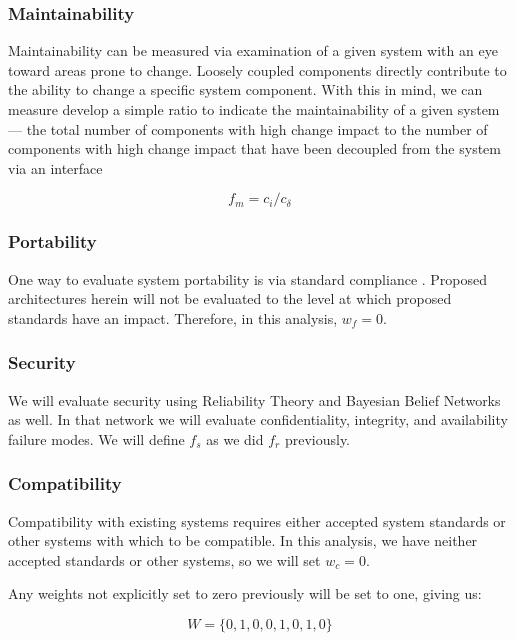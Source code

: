 \subsubsection*{Maintainability}
Maintainability can be measured via examination of a given system with an eye toward areas prone to change.  Loosely coupled components directly contribute to the ability to change a specific system component.  With this in mind, we can measure develop a simple ratio to indicate the maintainability of a given system --- the total number of components with high change impact to the number of components with high change impact that have been decoupled from the system via an interface 

\begin{equation}
f_{m} = c_{i} / c_{\delta}
\end{equation}

\subsubsection*{Portability}
One way to evaluate system portability is via standard compliance \cite{5958158}.  Proposed architectures herein will not be evaluated to the level at which proposed standards have an impact.  Therefore, in this analysis, $ w_{f} =0 $.

\subsubsection*{Security}
We will evaluate security using Reliability Theory and Bayesian Belief Networks as well.  In that network we will evaluate confidentiality, integrity, and availability failure modes.  We will define $ f_{s} $ as we did $ f_{r} $ previously.

\subsubsection*{Compatibility}
Compatibility with existing systems requires either accepted system standards or other systems with which to be compatible.  In this analysis, we have neither accepted standards or other systems, so we will set $ w_{c} = 0 $.

Any weights not explicitly set to zero previously will be set to one, giving us:

\begin{equation}
W = \lbrace 0, 1, 0, 0, 1, 0, 1, 0 \rbrace
\end{equation}

